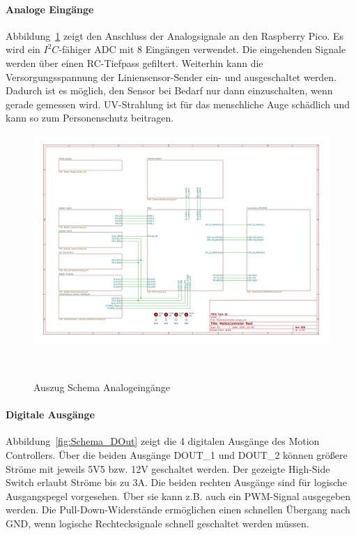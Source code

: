 \documentclass[main.  tex]{subfiles} %
\begin{document}
\paragraph{Analoge Eingänge}
Abbildung~\ref{fig:Schema_AIn} zeigt den Anschluss der Analogsignale an den
Raspberry Pico. Es wird ein $I^2C$-fähiger ADC mit 8 Eingängen verwendet. Die
eingehenden Signale werden über einen RC-Tiefpass gefiltert. Weiterhin kann die
Versorgungsspannung der Liniensensor-Sender ein- und ausgeschaltet werden.
Dadurch ist es möglich, den Sensor bei Bedarf nur dann einzuschalten, wenn
gerade gemessen wird. UV-Strahlung ist für das menschliche Auge schädlich und
kann so zum Personenschutz beitragen.

\begin{figure}[h!]
    \centering
    \includegraphics[page=7,width=\textwidth]{../Anhang_pdfs/MotionController.pdf}
    \caption{Auszug Schema Analogeingänge}~\label{fig:Schema_AIn}
\end{figure}

\paragraph{Digitale Ausgänge}
Abbildung~\ref{fig:Schema_DOut} zeigt die 4 digitalen Ausgänge des Motion
Controllers. Über die beiden Ausgänge DOUT\_1 und DOUT\_2 können größere Ströme
mit jeweils 5V5 bzw. 12V geschaltet werden. Der gezeigte High-Side Switch
erlaubt Ströme bis zu 3A. Die beiden rechten Ausgänge sind für logische
Ausgangspegel vorgesehen. Über sie kann z.B. auch ein PWM-Signal ausgegeben
werden. Die Pull-Down-Widerstände ermöglichen einen schnellen Übergang nach
GND, wenn logische Rechtecksignale schnell geschaltet werden müssen.
\end{document}
